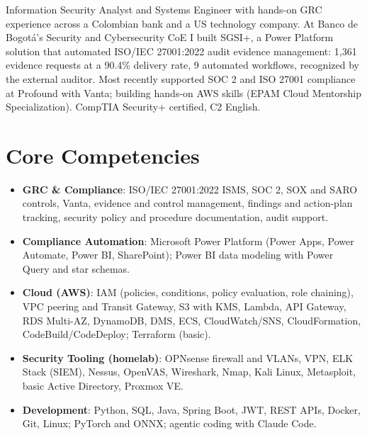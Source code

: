 \documentclass[11pt,a4paper,sans]{moderncv}
\begin{document}
\makecvtitle


\vspace{6pt}
\small{Information Security Analyst and Systems Engineer with hands-on GRC experience across a Colombian bank and a US technology company. At Banco de Bogot\'a's Security and Cybersecurity CoE I built SGSI+, a Power Platform solution that automated ISO/IEC 27001:2022 audit evidence management: 1,361 evidence requests at a 90.4\% delivery rate, 9 automated workflows, recognized by the external auditor. Most recently supported SOC 2 and ISO 27001 compliance at Profound with Vanta; building hands-on AWS skills (EPAM Cloud Mentorship Specialization). CompTIA Security+ certified, C2 English.}


\section{Core Competencies}
\vspace{1pt}
\begin{itemize}

\item \textbf{GRC \& Compliance}: ISO/IEC 27001:2022 ISMS, SOC 2, SOX and SARO controls, Vanta, evidence and control management, findings and action-plan tracking, security policy and procedure documentation, audit support.

\item \textbf{Compliance Automation}: Microsoft Power Platform (Power Apps, Power Automate, Power BI, SharePoint); Power BI data modeling with Power Query and star schemas.

\item \textbf{Cloud (AWS)}: IAM (policies, conditions, policy evaluation, role chaining), VPC peering and Transit Gateway, S3 with KMS, Lambda, API Gateway, RDS Multi-AZ, DynamoDB, DMS, ECS, CloudWatch/SNS, CloudFormation, CodeBuild/CodeDeploy; Terraform (basic).

\item \textbf{Security Tooling (homelab)}: OPNsense firewall and VLANs, VPN, ELK Stack (SIEM), Nessus, OpenVAS, Wireshark, Nmap, Kali Linux, Metasploit, basic Active Directory, Proxmox VE.

\item \textbf{Development}: Python, SQL, Java, Spring Boot, JWT, REST APIs, Docker, Git, Linux; PyTorch and ONNX; agentic coding with Claude Code.

\end{itemize}
\end{document}
